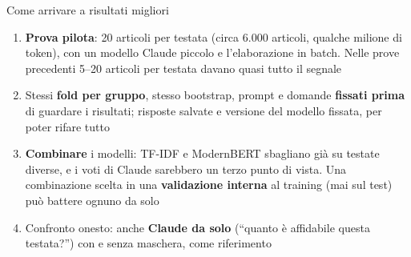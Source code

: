 \documentclass[aspectratio=169]{beamer}
\newcommand{\hl}[1]{\textbf{#1}}
\begin{document}
\begin{frame}{Come arrivare a risultati migliori}
  \begin{enumerate}[<+->]
    \setlength\itemsep{0.6em}
    \item \hl{Prova pilota}: 20 articoli per testata (circa 6.000 articoli, qualche milione di token), con un modello Claude piccolo e l'elaborazione in batch. Nelle prove precedenti 5--20 articoli per testata davano quasi tutto il segnale
    \item Stessi \hl{fold per gruppo}, stesso bootstrap, prompt e domande \hl{fissati prima} di guardare i risultati; risposte salvate e versione del modello fissata, per poter rifare tutto
    \item \hl{Combinare} i modelli: TF-IDF e ModernBERT sbagliano gi\`a su testate diverse, e i voti di Claude sarebbero un terzo punto di vista. Una combinazione scelta in una \hl{validazione interna} al training (mai sul test) pu\`o battere ognuno da solo
    \item Confronto onesto: anche \hl{Claude da solo} (``quanto \`e affidabile questa testata?'') con e senza maschera, come riferimento
  \end{enumerate}
\end{frame}
\end{document}
